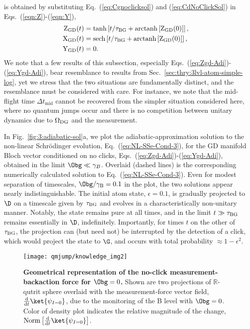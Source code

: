 is obtained by substituting Eq.~(\ref{eq:Cgnoclicksol}) and (\ref{eq:CdNoClickSol})
in Eqs.~(\ref{eqn:Z})-(\ref{eqn:Y}), 
\begin{align}
{\rm Z}_{{\rm GD}}(t) & ={\rm tanh}\left[t/\tau_{{\rm BG}}+\mathrm{arctanh}\left[{\rm Z}_{{\rm GD}}(0)\right]\right],\label{eq:Zgd-Adi}\\
{\rm X}_{{\rm GD}}(t) & ={\rm sech}\left[t/\tau_{{\rm BG}}+\mathrm{arctanh}\left[{\rm Z}_{{\rm GD}}(0)\right]\right],\\
{\rm Y}_{{\rm GD}}(t) & =0.\label{eq:Ygd-Adi}
\end{align}
We note that a few results of this subsection, especially Eqs.~(\ref{eq:Zgd-Adi})-(\ref{eq:Ygd-Adi}),
bear resemblance to results from Sec.~\ref{sec:thry:3lvl-atom-simple-log},
yet we stress that  the two situations are fundamentally distinct,
and the resemblance must be considered with care. For instance, we
note that the mid-flight time $\Delta t_{\mathrm{mid}}$ cannot be
recovered from the simpler situation considered here, where no quantum
jumps occur and there is no competition between unitary dynamics due
to $\Omega_{{\rm DG}}$ and the measurement. 

In Fig.~\ref{fig:3:adiabatic-sol}a, we plot the adiabatic-approximation
solution to the non-linear Schrödinger evolution, Eq.~(\ref{eq:NL-SSe-Cond-3}),
for the GD manifold Bloch vector conditioned on no clicks, Eqs.~(\ref{eq:Zgd-Adi})-(\ref{eq:Ygd-Adi}),
obtained in the limit $\Obg\ll\gamma_{B}$. Overlaid (dashed lines)
is the corresponding numerically calculated solution to Eq.~(\ref{eq:NL-SSe-Cond-3}).
Even for modest separation of timescales, $\Obg/\gamma_{{\rm B}}=0.1$
in the plot, the two solutions appear nearly indistinguishable. The
initial atom state, $\epsilon=0.1$, is gradually projected to $\D$
on a timescale given by $\tau_{{\rm BG}}$ and evolves in a characteristically
non-unitary manner. Notably, the state remains pure at all times,
and in the limit $t\gg\tau_{{\rm BG}}$ remains essentially in $\D$,
indefinitely. Importantly, for times $t$ on the other of $\tau_{{\rm BG}}$,
the projection can (but need not) be interrupted by the detection
of a click, which would project the state to $\G$, and occurs with
total probability $\approx1-\epsilon^{2}$. 
\begin{figure}
\begin{centering}
\texttt{[image: qmjump/knowledge\_img2]}
\par\end{centering}
\caption[Geometrical representation of the no-click measurement-backaction
force for $\Obg=0$]{\textbf{\label{fig:Knowledge-driven-force-in-1}Geometrical representation
of the no-click measurement-backaction  force for $\Obg=0$.} Shown
are two projections of $\mathbb{\mathbb{\mathbb{R}}}$-qutrit sphere
overlaid with the measurement-force vector field, $\frac{\mathrm{d}}{\mathrm{d}t}\ket{\psi_{I=0}}$,
due to the monitoring of the B level with $\Obg=0$. Color of density
plot indicates the relative magnitude of the change, $\mathrm{Norm}\left[\frac{\mathrm{d}}{\mathrm{d}t}\ket{\psi_{I=0}}\right]$.}
\end{figure}


